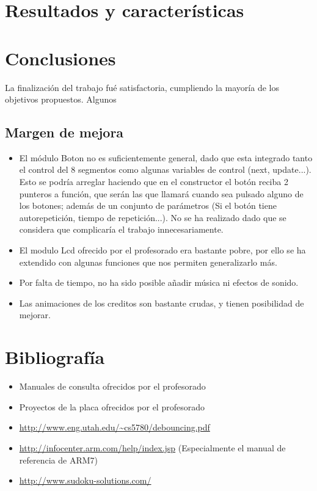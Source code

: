 \documentclass[12pt,letterpaper]{article}
\begin{document}
\section{Resultados y características}

\section{Conclusiones}
La finalización del trabajo fué satisfactoria, cumpliendo la mayoría
de los objetivos propuestos.
Algunos


\subsection{Margen de mejora}
\begin{itemize}
  \item El módulo Boton no es suficientemente general, dado que esta
    integrado tanto el control del 8 segmentos como algunas variables
    de control (next, update...). Esto se podría arreglar haciendo que
    en el constructor el botón reciba 2 punteros a función, que serán
    las que llamará cuando sea pulsado alguno de los botones; además
    de un conjunto de parámetros (Si el botón tiene autorepetición,
    tiempo de repetición...). No se ha realizado dado que se considera
    que complicaría el trabajo innecesariamente.
  \item El modulo Lcd ofrecido por el profesorado era bastante pobre,
    por ello se ha extendido con algunas funciones que nos permiten
    generalizarlo más.
  \item Por falta de tiempo, no ha sido posible añadir música ni
    efectos de sonido.
  \item Las animaciones de los creditos son bastante crudas, y tienen
    posibilidad de mejorar.
\end{itemize}
\section{Bibliografía}
\begin{itemize}
  \item Manuales de consulta ofrecidos por el profesorado
  \item Proyectos de la placa ofrecidos por el profesorado
  \item \url{http://www.eng.utah.edu/~cs5780/debouncing.pdf}
  \item \url{http://infocenter.arm.com/help/index.jsp} (Especialmente el
    manual de referencia de ARM7)
  \item \url{http://www.sudoku-solutions.com/}
\end{itemize}
\end{document}
